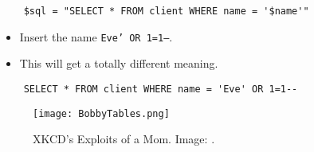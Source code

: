 
\begin{frame}[fragile]
  \begin{verbatim}
    $sql = "SELECT * FROM client WHERE name = '$name'"
  \end{verbatim}

  \pause

  \begin{itemize}
    \item Insert the name \texttt{Eve' OR 1=1--}.
    \item This will get a totally different meaning.
  \end{itemize}

  \pause

  \begin{verbatim}
    SELECT * FROM client WHERE name = 'Eve' OR 1=1--
  \end{verbatim}
\end{frame}

\begin{frame}
  \begin{figure}
    \centering
    \texttt{[image: BobbyTables.png]}
    \caption{%
      XKCD's Exploits of a Mom.
      Image: \cite{BobbyTables}.
    }
  \end{figure}
\end{frame}


